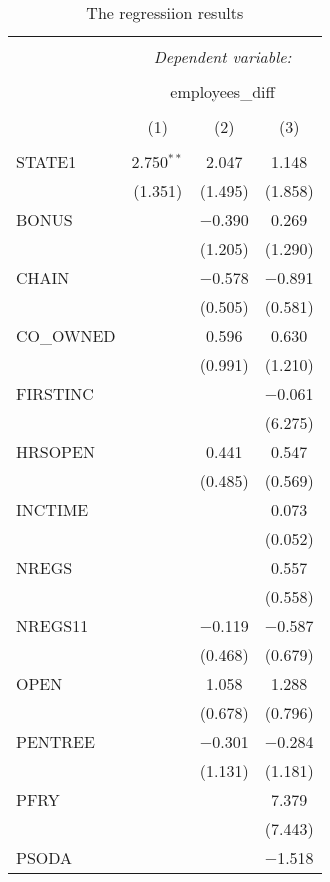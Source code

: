 
\begin{table}[H] \centering 
  \caption{The regressiion results} 
  \label{} 
\begin{tabular}{@{\extracolsep{5pt}}lccc} 
\\[-1.8ex]\hline 
\hline \\[-1.8ex] 
 & \multicolumn{3}{c}{\textit{Dependent variable:}} \\ 
\cline{2-4} 
\\[-1.8ex] & \multicolumn{3}{c}{employees\_diff} \\ 
\\[-1.8ex] & (1) & (2) & (3)\\ 
\hline \\[-1.8ex] 
 STATE1 & 2.750$^{**}$ & 2.047 & 1.148 \\ 
  & (1.351) & (1.495) & (1.858) \\ 
  BONUS &  & $-$0.390 & 0.269 \\ 
  &  & (1.205) & (1.290) \\ 
  CHAIN &  & $-$0.578 & $-$0.891 \\ 
  &  & (0.505) & (0.581) \\ 
  CO\_OWNED &  & 0.596 & 0.630 \\ 
  &  & (0.991) & (1.210) \\ 
  FIRSTINC &  &  & $-$0.061 \\ 
  &  &  & (6.275) \\ 
  HRSOPEN &  & 0.441 & 0.547 \\ 
  &  & (0.485) & (0.569) \\ 
  INCTIME &  &  & 0.073 \\ 
  &  &  & (0.052) \\ 
  NREGS &  &  & 0.557 \\ 
  &  &  & (0.558) \\ 
  NREGS11 &  & $-$0.119 & $-$0.587 \\ 
  &  & (0.468) & (0.679) \\ 
  OPEN &  & 1.058 & 1.288 \\ 
  &  & (0.678) & (0.796) \\ 
  PENTREE &  & $-$0.301 & $-$0.284 \\ 
  &  & (1.131) & (1.181) \\ 
  PFRY &  &  & 7.379 \\ 
  &  &  & (7.443) \\ 
  PSODA &  &  & $-$1.518 \\ 

\end{tabular}
\end{table}
